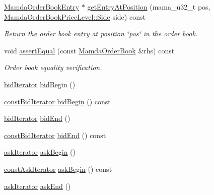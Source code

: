 \begin{CompactItemize}
\hyperlink{classWombat_1_1MamdaOrderBookEntry}{Mamda\-Order\-Book\-Entry} $\ast$ \hyperlink{classWombat_1_1MamdaOrderBook_f220bb5858948b27e5fd02229dffb30c}{get\-Entry\-At\-Position} (mama\_\-u32\_\-t pos, \hyperlink{classWombat_1_1MamdaOrderBookPriceLevel_384c34b0a74d874b8969dee9b0d3718d}{Mamda\-Order\-Book\-Price\-Level::Side} side) const 
\begin{CompactList}\small\item\em Return the order book entry at position \char`\"{}pos\char`\"{} in the order book. \item\end{CompactList}\item 
void \hyperlink{classWombat_1_1MamdaOrderBook_bf398229e189a73311d14fc5765c28de}{assert\-Equal} (const \hyperlink{classWombat_1_1MamdaOrderBook}{Mamda\-Order\-Book} \&rhs) const 
\begin{CompactList}\small\item\em Order book equality verification. \item\end{CompactList}\item 
\hyperlink{classWombat_1_1MamdaOrderBook_1_1bidIterator}{bid\-Iterator} \hyperlink{classWombat_1_1MamdaOrderBook_8e110890737405ea8cd1d6edd90ec61b}{bid\-Begin} ()
\item 
\hyperlink{classWombat_1_1MamdaOrderBook_1_1bidIterator}{const\-Bid\-Iterator} \hyperlink{classWombat_1_1MamdaOrderBook_4b231fc2074bfb87af693c82c315dd10}{bid\-Begin} () const 
\item 
\hyperlink{classWombat_1_1MamdaOrderBook_1_1bidIterator}{bid\-Iterator} \hyperlink{classWombat_1_1MamdaOrderBook_84a7d4b1580b4640897af10bc13908ab}{bid\-End} ()
\item 
\hyperlink{classWombat_1_1MamdaOrderBook_1_1bidIterator}{const\-Bid\-Iterator} \hyperlink{classWombat_1_1MamdaOrderBook_706f1e3cfffd890176683bca10584d16}{bid\-End} () const 
\item 
\hyperlink{classWombat_1_1MamdaOrderBook_1_1askIterator}{ask\-Iterator} \hyperlink{classWombat_1_1MamdaOrderBook_9035064d41049efafb1be14de7901fa1}{ask\-Begin} ()
\item 
\hyperlink{classWombat_1_1MamdaOrderBook_1_1askIterator}{const\-Ask\-Iterator} \hyperlink{classWombat_1_1MamdaOrderBook_528eba86f58b3e4c3fd135a775f69ff3}{ask\-Begin} () const 
\item 
\hyperlink{classWombat_1_1MamdaOrderBook_1_1askIterator}{ask\-Iterator} \hyperlink{classWombat_1_1MamdaOrderBook_e39211f1e853b8e0de3dc827fd2d19c9}{ask\-End} ()

\end{CompactItemize}
